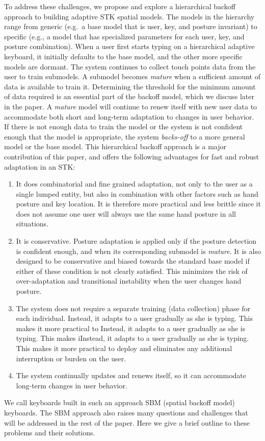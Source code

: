 \documentclass{sigchi}
\begin{document}
To address these challenges, we propose and explore a hierarchical backoff approach to building adaptive STK spatial models. The models in the hierarchy range from generic (e.g.\ a base model that is user, key, and posture invariant) to specific (e.g., a model that has specialized parameters for each user, key, and posture combination). When a user first starts typing on a hierarchical adaptive keyboard, it initially defaults to the base model, and the other more specific models are dormant. The system continues to collect touch points data from the user to train submodels. A submodel becomes \textit{mature} when a sufficient amount of data is available to train it. Determining the threshold for the minimum amount of data required is an essential part of the backoff model, which we discuss later in the paper.
A \textit{mature} model will continue to renew itself with new user data to accommodate  both short and long-term adaptation to changes in user behavior. If there is not enough data to train the model or the system is not confident enough that the model is appropriate, the system \textit{backs-off} to a more general model or the base model. This hierarchical backoff approach is a major contribution of this paper, and offers the following advantages for fast and robust adaptation in an STK:
\begin{enumerate}
\item It does combinatorial and fine grained adaptation, not only to the user as
a single lumped entity, but also in combination with other factors such as hand
posture and key location. It is therefore more practical and less brittle since it does not assume one user will always use the same hand posture in all situations.

\item It is conservative. Posture adaptation is applied only if the posture detection is confident enough, and when its corresponding submodel is \textit{mature}. It is also designed to be conservative and biased towards the standard base model if either of these condition is not clearly satisfied. This minimizes the risk of over-adaptation and transitional instability when the user changes hand posture. 
 
\item The system does not require a separate training (data collection) phase
for each individual. Instead, it adapts to a user gradually as she is typing.
This makes it more practical to Instead, it adapts to a user gradually as she is
typing. This makes iInstead, it adapts to a user gradually as she is typing.
This makes it more practical to deploy and eliminates any additional
interruption or burden on the user.

\item The system continually updates and renews itself, so it can accommodate
long-term changes in user behavior.
\end{enumerate}
We call keyboards built in such an approach SBM (spatial backoff model)
keyboards. The SBM approach also raises many questions and challenges that will
be addressed in the rest of the paper. Here we give a brief outline to these problems and their solutions.
\end{document}
